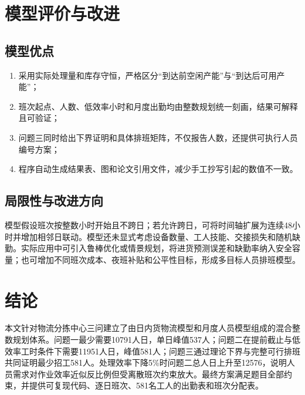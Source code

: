 \section{模型评价与改进}

\subsection{模型优点}

\begin{enumerate}[label=\arabic*)]
  \item 采用实际处理量和库存守恒，严格区分“到达前空闲产能”与“到达后可用产能”；
  \item 班次起点、人数、低效率小时和月度出勤均由整数规划统一刻画，结果可解释且可验证；
  \item 问题三同时给出下界证明和具体排班矩阵，不仅报告人数，还提供可执行人员编号方案；
  \item 程序自动生成结果表、图和论文引用文件，减少手工抄写引起的数值不一致。
\end{enumerate}

\subsection{局限性与改进方向}

模型假设班次按整数小时开始且不跨日；若允许跨日，可将时间轴扩展为连续48小时并增加相邻日联动。模型还未显式考虑设备数量、工人技能、交接损失和随机缺勤。实际应用中可引入鲁棒优化或情景规划，将进货预测误差和缺勤率纳入安全容量；也可增加不同班次成本、夜班补贴和公平性目标，形成多目标人员排班模型。

\section{结论}

本文针对物流分拣中心三问建立了由日内货物流模型和月度人员模型组成的混合整数规划体系。问题一最少需要10791人日，单日峰值537人；问题二在提前截止与低效率工时条件下需要11951人日，峰值581人；问题三通过理论下界与完整可行排班共同证明最少招工581人。处理效率下降5\%时问题二总人日上升至12576，说明人员需求对作业效率近似反比例但受离散班次约束放大。最终方案满足题目全部约束，并提供可复现代码、逐日班次、581名工人的出勤表和班次分配表。
